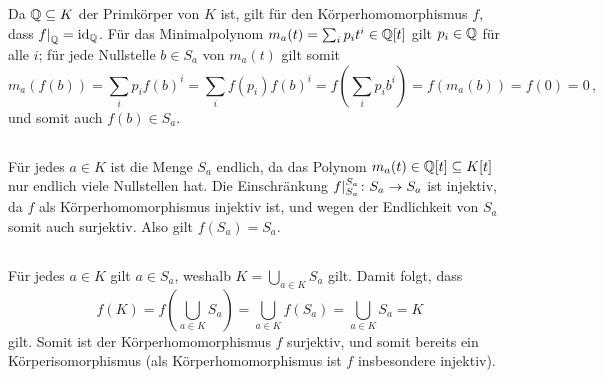 \section{}





\subsection{}

Da $\mathbb{Q} \subseteq K$ der Primkörper von $K$ ist, gilt für den Körperhomomorphismus $f$, dass $\restrict{f}{\Rational} = \id_\Rational$.
Für das Minimalpolynom $m_a(t) = \sum_i p_i t^i \in \mathbb{Q}[t]$ gilt $p_i \in \mathbb{Q}$ für alle $i$;
für jede Nullstelle $b \in S_a$ von $m_a(t)$ gilt somit
\[
    m_a( f(b) )
  = \sum_i p_i f(b)^i
  = \sum_i f(p_i) f(b)^i
  = f\left( \sum_i p_i b^i \right)
  = f( m_a(b) )
  = f( 0 )
  = 0 \,,
\]
und somit auch $f(b) \in S_a$.





\subsection{}

Für jedes $a \in K$ ist die Menge $S_a$ endlich, da das Polynom $m_a(t) \in \mathbb{Q}[t] \subseteq K[t]$ nur endlich viele Nullstellen hat.
Die Einschränkung $\restrict{f}{S_a}[S_a] \colon S_a \to S_a$ ist injektiv, da $f$ als Körperhomomorphismus injektiv ist, und wegen der Endlichkeit von $S_a$ somit auch surjektiv.
Also gilt $f(S_a) = S_a$.





\subsection{}

Für jedes $a \in K$ gilt $a \in S_a$, weshalb $K = \bigcup_{a \in K} S_a$ gilt.
Damit folgt, dass
\[
    f(K)
  = f\left( \bigcup_{a \in K} S_a \right)
  = \bigcup_{a \in K} f(S_a)
  = \bigcup_{a \in K} S_a
  = K
\]
gilt.
Somit ist der Körperhomomorphismus $f$ surjektiv, und somit bereits ein Körperisomorphismus (als Körperhomomorphismus ist $f$ insbesondere injektiv).
